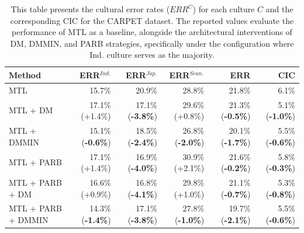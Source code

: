 \begin{table} [H]
\centering
\scriptsize
\begin{tabular}{lrrrrr}
\toprule
\textbf{Method} & \textbf{ERR$^{Ind.}$} & \textbf{ERR$^{Jap.}$} & \textbf{ERR$^{Scan.}$} & \textbf{ERR} & \textbf{CIC} \\
\midrule
MTL  & 15.7\% & 20.9\% & 28.8\% & 21.8\% & 6.1\% \\
MTL +  DM    & 17.1\% (+1.4\%) & 17.1\% (\textbf{-3.8\%}) & 29.6\% (+0.8\%) & 21.3\% (\textbf{-0.5\%}) & 5.1\% (\textbf{-1.0\%}) \\
MTL +  DMMIN & 15.1\% (\textbf{-0.6\%}) & 18.5\% (\textbf{-2.4\%}) & 26.8\% (\textbf{-2.0\%}) & 20.1\% (\textbf{-1.7\%}) & 5.5\% (\textbf{-0.6\%}) \\
\hline
MTL + PARB     & 17.1\% (+1.4\%) & 16.9\% (\textbf{-4.0\%}) & 30.9\% (+2.1\%) & 21.6\% (\textbf{-0.2\%}) & 5.8\% (\textbf{-0.3\%}) \\
MTL + PARB + DM & 16.6\% (+0.9\%) & 16.8\% (\textbf{-4.1\%}) & 29.8\% (+1.0\%) & 21.1\% (\textbf{-0.7\%}) & 5.3\% (\textbf{-0.8\%}) \\
MTL + PARB + DMMIN & 14.3\% (\textbf{-1.4\%}) & 17.1\% (\textbf{-3.8\%}) & 27.8\% (\textbf{-1.0\%}) & 19.7\% (\textbf{-2.1\%}) & 5.5\% (\textbf{-0.6\%}) \\
\bottomrule
\end{tabular}
\caption{This table presents the cultural error rates ($ERR^C$) for each culture $C$ and the corresponding CIC for the CARPET dataset. The reported values evaluate the performance of MTL as a baseline, alongside the architectural interventions of DM, DMMIN, and PARB strategies, specifically under the configuration where Ind. culture serves as the majority.}
\label{ch3:tab:mtl_and_da:CI}
\end{table}
%
%
